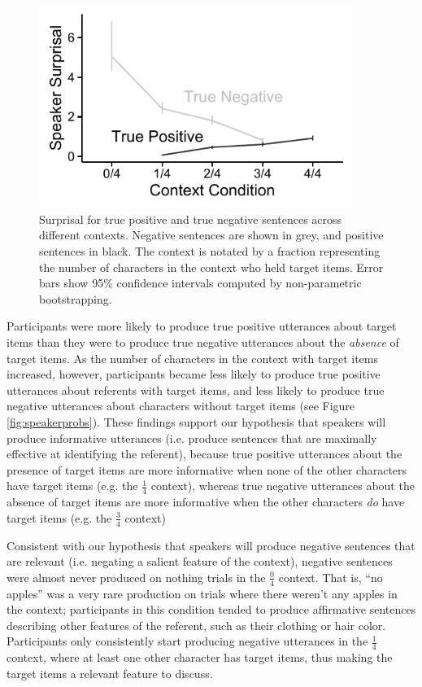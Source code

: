\documentclass[man, noapacite]{apa2}
\begin{document}
\begin{figure}[t]
\begin{center}
\includegraphics[width=4in]{figures/surprisals_mod.pdf}
\caption{\label{fig:speakersurprise} Surprisal for true positive and true negative sentences across different contexts. Negative sentences are shown in grey, and positive sentences in black.  The context is notated by a fraction representing the number of characters in the context who held target items. Error bars show 95\% confidence intervals computed by non-parametric bootstrapping.  }
\end{center}
\end{figure}

Participants were more likely to produce true positive utterances about target items than they were to produce true negative utterances about the \emph{absence} of target items. As the number of characters in the context with target items increased, however, participants became less likely to produce true positive utterances about referents with target items, and less likely to produce true negative utterances about characters without target items (see Figure \ref{fig:speakerprobs}). These findings support our hypothesis that speakers will produce informative utterances (i.e. produce sentences that are maximally effective at identifying the referent), because true positive utterances about the presence of target items are more informative when none of the other characters have target items (e.g. the $\frac{1}{4}$ context), whereas true negative utterances about the absence of target items are more informative when the other characters \emph{do} have target items (e.g. the $\frac{3}{4}$ context)

Consistent with our hypothesis that speakers will produce negative sentences that are relevant (i.e. negating a salient feature of the context), negative sentences were almost never produced on nothing trials in the $\frac{0}{4}$ context. That is, ``no apples'' was a very rare production on trials where there weren't any apples in the context; participants in this condition tended to produce affirmative sentences describing other features of the referent, such as their clothing or hair color. Participants only consistently start producing negative utterances in the $\frac{1}{4}$ context, where at least one other character has target items, thus making the target items a relevant feature to discuss.
\end{document}
